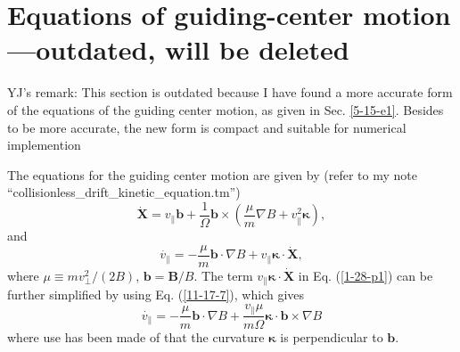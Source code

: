 \documentclass{article}
\begin{document}
\section{Equations of guiding-center motion---outdated, will be deleted}

YJ's remark: This section is outdated because I have found a more accurate
form of the equations of the guiding center motion, as given in Sec.
\ref{5-15-e1}. Besides to be more accurate, the new form is compact and
suitable for numerical implemention

The equations for the guiding center motion are given by (refer to my note
``collisionless\_drift\_kinetic\_equation.tm'')
\begin{equation}
  \label{11-17-7} \dot{\mathbf{X}} = v_{\parallel} \mathbf{b}+
  \frac{1}{\Omega} \mathbf{b} \times \left( \frac{\mu}{m} \nabla B +
  v_{\parallel}^2 \mathbf{\kappa} \right),
\end{equation}
and
\begin{equation}
  \label{1-28-p1} \dot{v_{\parallel}} = - \frac{\mu}{m} \mathbf{b} \cdot
  \nabla B + v_{\parallel} \mathbf{\kappa} \cdot \dot{\mathbf{X}},
\end{equation}
where $\mu \equiv m v_{\perp}^2 / (2 B)$, $\mathbf{b}=\mathbf{B}/ B$. The term
$v_{\parallel} \mathbf{\kappa} \cdot \dot{\mathbf{X}}$ in Eq. (\ref{1-28-p1})
can be further simplified by using Eq. (\ref{11-17-7}), which gives
\begin{equation}
  \label{11-17-8} \dot{v_{\parallel}} = - \frac{\mu}{m} \mathbf{b} \cdot
  \nabla B + \frac{v_{\parallel} \mu}{m \Omega} \mathbf{\kappa} \cdot
  \mathbf{b} \times \nabla B
\end{equation}
where use has been made of that the curvature $\mathbf{\kappa}$ is
perpendicular to $\mathbf{b}$.
\end{document}
